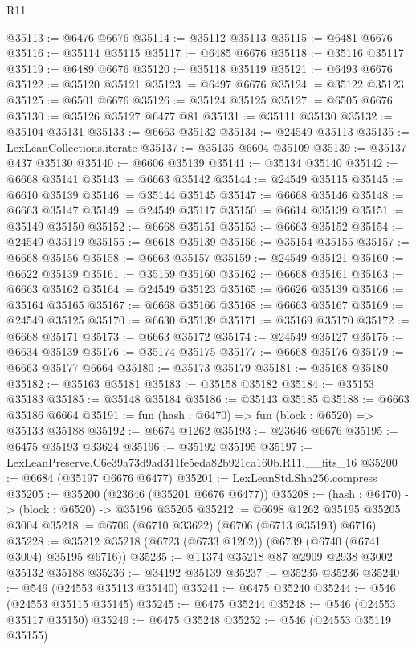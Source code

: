 \begin{lexlean}{R11}
\begin{coremodule}
@35113 := @6476 @6676
@35114 := @35112 @35113
@35115 := @6481 @6676
@35116 := @35114 @35115
@35117 := @6485 @6676
@35118 := @35116 @35117
@35119 := @6489 @6676
@35120 := @35118 @35119
@35121 := @6493 @6676
@35122 := @35120 @35121
@35123 := @6497 @6676
@35124 := @35122 @35123
@35125 := @6501 @6676
@35126 := @35124 @35125
@35127 := @6505 @6676
@35130 := @35126 @35127 @6477 @81
@35131 := @35111 @35130
@35132 := @35104 @35131
@35133 := @6663 @35132
@35134 := @24549 @35113
@35135 := LexLeanCollections.iterate
@35137 := @35135 @6604 @35109
@35139 := @35137 @437 @35130
@35140 := @6606 @35139
@35141 := @35134 @35140
@35142 := @6668 @35141
@35143 := @6663 @35142
@35144 := @24549 @35115
@35145 := @6610 @35139
@35146 := @35144 @35145
@35147 := @6668 @35146
@35148 := @6663 @35147
@35149 := @24549 @35117
@35150 := @6614 @35139
@35151 := @35149 @35150
@35152 := @6668 @35151
@35153 := @6663 @35152
@35154 := @24549 @35119
@35155 := @6618 @35139
@35156 := @35154 @35155
@35157 := @6668 @35156
@35158 := @6663 @35157
@35159 := @24549 @35121
@35160 := @6622 @35139
@35161 := @35159 @35160
@35162 := @6668 @35161
@35163 := @6663 @35162
@35164 := @24549 @35123
@35165 := @6626 @35139
@35166 := @35164 @35165
@35167 := @6668 @35166
@35168 := @6663 @35167
@35169 := @24549 @35125
@35170 := @6630 @35139
@35171 := @35169 @35170
@35172 := @6668 @35171
@35173 := @6663 @35172
@35174 := @24549 @35127
@35175 := @6634 @35139
@35176 := @35174 @35175
@35177 := @6668 @35176
@35179 := @6663 @35177 @6664
@35180 := @35173 @35179
@35181 := @35168 @35180
@35182 := @35163 @35181
@35183 := @35158 @35182
@35184 := @35153 @35183
@35185 := @35148 @35184
@35186 := @35143 @35185
@35188 := @6663 @35186 @6664
@35191 := fun (hash : @6470) => fun (block : @6520) => @35133 @35188
@35192 := @6674 @1262
@35193 := @23646 @6676
@35195 := @6475 @35193 @33624
@35196 := @35192 @35195
@35197 := LexLeanPreserve.C6e39a73d9ad311fe5eda82b921ca160b.R11.__fits_16
@35200 := @6684 (@35197 @6676 @6477)
@35201 := LexLeanStd.Sha256.compress
@35205 := @35200 (@23646 (@35201 @6676 @6477))
@35208 := (hash : @6470) -> (block : @6520) -> @35196 @35205
@35212 := @6698 @1262 @35195 @35205 @3004
@35218 := @6706 (@6710 @33622) (@6706 (@6713 @35193) @6716)
@35228 := @35212 @35218 (@6723 (@6733 @1262)) (@6739 (@6740 (@6741 @3004) @35195 @6716))
@35235 := @11374 @35218 @87 @2909 @2938 @3002 @35132 @35188
@35236 := @34192 @35139
@35237 := @35235 @35236
@35240 := @546 (@24553 @35113 @35140)
@35241 := @6475 @35240
@35244 := @546 (@24553 @35115 @35145)
@35245 := @6475 @35244
@35248 := @546 (@24553 @35117 @35150)
@35249 := @6475 @35248
@35252 := @546 (@24553 @35119 @35155)

\end{coremodule}
\end{lexlean}
